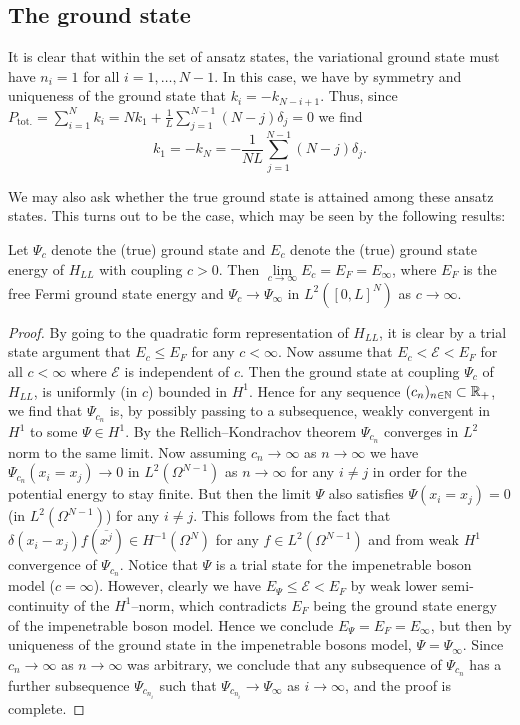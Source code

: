 	\subsection{The ground state}
	It is clear that within the set of ansatz states, the variational ground state must have $ n_i=1 $ for all $ i=1,\ldots, N-1 $. In this case, we have by symmetry and uniqueness of the ground state that $ k_i=-k_{N-i+1} $. Thus, since $ P_{\text{tot.}}=\sum_{i=1}^{N}k_i=Nk_1+\frac{1}{L}\sum_{j=1}^{N-1}(N-j)\delta_j=0 $ we find $$ k_1=-k_N=-\frac{1}{NL}\sum_{j=1}^{N-1}(N-j)\delta_j.$$
	
	We may also ask whether the true ground state is attained among these ansatz states. This turns out to be the case, which may be seen by the following results:
	\begin{lemma}\label{LemmaLLTrueGroundState}
		Let $ \Psi_c $ denote the (true) ground state and $ E_c $ denote the (true) ground state energy of $ H_{LL} $ with coupling $ c>0 $. Then $ \lim\limits_{c\to\infty}E_c=E_F=E_\infty $, where $ E_F $ is the free Fermi ground state energy and $ \Psi_c\to \Psi_{\infty} $ in $ L^2([0,L]^N) $ as $ c \to\infty $.
	\end{lemma}
	\begin{proof}
		By going to the quadratic form representation of $ H_{LL} $, it is clear by a trial state argument that $ E_c\leq E_F $ for any $ c<\infty $. Now assume that $ E_c<\mathcal{E}<E_F $ for all $ c<\infty $ where $ \mathcal{E} $ is independent of $ c $. Then the ground state at coupling $ \Psi_c $ of $ H_{LL} $, is uniformly (in $ c $) bounded in $ H^1 $. Hence for any sequence $ (c_n)_{n\in\mathbb{N}}\subset\mathbb{R}_+ $, we find that $ \Psi_{c_n} $ is, by possibly passing to a subsequence, weakly convergent in $ H^1 $ to some $ \Psi\in H^1 $. By the Rellich--Kondrachov theorem $ \Psi_{c_n} $ converges in $ L^2 $ norm to the same limit. Now assuming $ c_n\to\infty $ as $ n\to\infty $ we have $ \Psi_{c_n}(x_i=x_j)\to 0 $ in $ L^2(\Omega^{N-1}) $ as $ n\to\infty $ for any $ i\neq j $ in order for the potential energy to stay finite. But then the limit $ \Psi $ also satisfies $ \Psi(x_i=x_j)=0 $ (in $ L^2(\Omega^{N-1}) $) for any $ i\neq j $. This follows from the fact that $ \delta(x_i-x_j)f(\overline{x^j})\in H^{-1}(\Omega^{N}) $ for any $ f\in L^2(\Omega^{N-1}) $ and from weak $ H^1 $ convergence of $ \Psi_{c_n} $. Notice that $ \Psi $ is a trial state for the impenetrable boson model ($ c=\infty $). However, clearly we have $ E_\Psi\leq \mathcal{E}<E_F $ by weak lower semi-continuity of the $ H^1 $--norm, which contradicts $ E_F $ being the ground state energy of the impenetrable boson model. Hence we conclude $ E_\Psi=E_F=E_\infty $, but then by uniqueness of the ground state in the impenetrable bosons model, $ \Psi=\Psi_\infty $. Since $ c_n\to \infty $ as $ n\to\infty $ was arbitrary, we conclude that any subsequence of $ \Psi_{c_n} $ has a further subsequence $ \Psi_{c_{n_i}} $ such that $ \Psi_{c_{n_i}}\to\Psi_\infty $ as $ i\to\infty $, and the proof is complete. 
	\end{proof}
